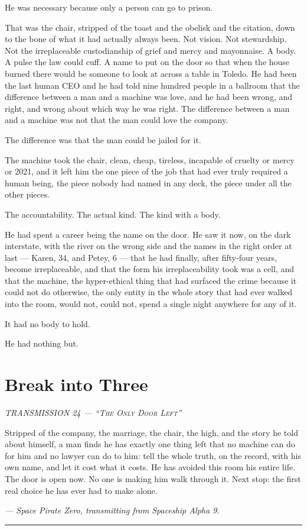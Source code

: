 \documentclass[11pt,openany]{book}
\newcommand{\transheader}{\normalfont\footnotesize\scshape\letterspace}
\newcommand{\letterspace}{}
\newenvironment{transmission}{%
  \par\vspace{0.3\baselineskip}\begin{center}\begin{minipage}{0.88\textwidth}%
  \itshape\small\setlength{\parindent}{0pt}\setstretch{1.06}}%
  {\end{minipage}\end{center}\vspace{0.4\baselineskip}%
  \noindent\hfil\rule{0.35\textwidth}{0.3pt}\hfil\par\vspace{1.0\baselineskip}}
\begin{document}
He was necessary because only a person can go to prison.

That was the chair, stripped of the toast and the obelisk and the citation, down to the bone of what it had actually always been. Not vision. Not stewardship. Not the irreplaceable custodianship of grief and mercy and mayonnaise. A body. A pulse the law could cuff. A name to put on the door so that when the house burned there would be someone to look at across a table in Toledo. He had been the last human CEO and he had told nine hundred people in a ballroom that the difference between a man and a machine was love, and he had been wrong, and right, and wrong about which way he was right. The difference between a man and a machine was not that the man could love the company.

The difference was that the man could be jailed for it.

The machine took the chair, clean, cheap, tireless, incapable of cruelty or mercy or 2021, and it left him the one piece of the job that had ever truly required a human being, the piece nobody had named in any deck, the piece under all the other pieces.

The accountability. The actual kind. The kind with a body.

He had spent a career being the name on the door. He saw it now, on the dark interstate, with the river on the wrong side and the names in the right order at last --- Karen, 34, and Petey, 6 --- that he had finally, after fifty-four years, become irreplaceable, and that the form his irreplaceability took was a cell, and that the machine, the hyper-ethical thing that had surfaced the crime because it could not do otherwise, the only entity in the whole story that had ever walked into the room, would not, could not, spend a single night anywhere for any of it.

It had no body to hold.

He had nothing but.

\clearpage
\chapter{Break into Three}

\begin{transmission}
{\transheader TRANSMISSION 24 --- ``The Only Door Left''}\par\vspace{0.5em}
Stripped of the company, the marriage, the chair, the high, and the story he told about himself, a man finds he has exactly one thing left that no machine can do for him and no lawyer can do to him: tell the whole truth, on the record, with his own name, and let it cost what it costs. He has avoided this room his entire life. The door is open now. No one is making him walk through it. Next stop: the first real choice he has ever had to make alone.\par
\vspace{0.5em}\hfill\textit{--- Space Pirate Zero, transmitting from Spaceship Alpha 9.}\par
\end{transmission}
\end{document}

